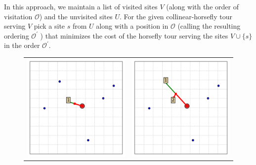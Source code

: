 \documentclass[11.5pt]{report}
\begin{document}
\newchunk In this approach, we maintain a list of visited sites $V$ (along with the order of visitation 
          $\mathcal{O}$) and the unvisited sites $U$. For the given collinear-horsefly tour serving $V$ 
          pick a site $s$ from $U$ along with a position in $\mathcal{O}$ (calling the resulting ordering  
          $\mathcal{O^{'}}$  ) that minimizes the cost of the horsefly tour serving the sites $V \cup \{s\}$ 
          in the order $\mathcal{O^{'}}$. 


\begin{figure}[H]
\centering
\begin{tabular}{cc}
\includegraphics[width=8cm]{../webs/docs/algo-greedy-incremental-insertion---Day-2018-12-24_ClockTime-19:31:02/algo_state_00000.png}&
\includegraphics[width=8cm]{../webs/docs/algo-greedy-incremental-insertion---Day-2018-12-24_ClockTime-19:31:02/algo_state_00001.png}\\

\end{tabular}
\end{figure}
\end{document}
